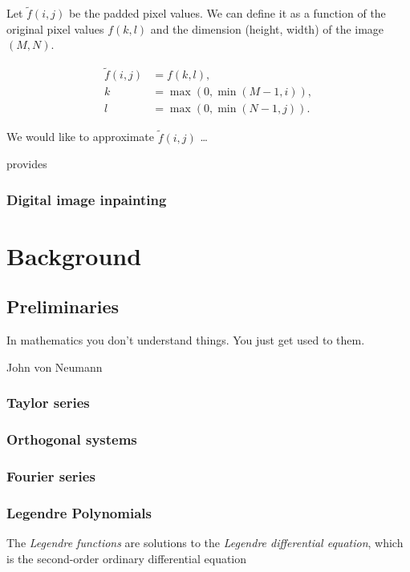 \documentclass[12pt]{article} %
\begin{document}
Let $\tilde{f}(i, j)$ be the padded pixel values. We can define it as a function 
of the original pixel values $f(k, l)$ and the dimension (height, width) of the 
image $(M, N)$.

\begin{align*}
  \tilde{f}(i, j) &= f(k, l), \\
  k               &= \max(0, \min(M-1, i)), \\
  l               &= \max(0, \min(N-1, j)).
\end{align*}

We would like to approximate $\tilde{f}(i, j)$ \dots

\citet[see][p.~114-115]{Szeliski2011} provides 

\subsubsection{Digital image inpainting}

\newpage

\section{Background}

\subsection{Preliminaries}

\epigraph{In mathematics you don't understand things. You just get used to them.}{John von Neumann}

\subsubsection{Taylor series}

\subsubsection{Orthogonal systems}
 
\subsubsection{Fourier series}

\subsubsection{Legendre Polynomials}

The \emph{Legendre functions} are solutions to the \emph{Legendre differential 
equation}, which is the second-order ordinary differential equation
\end{document}
